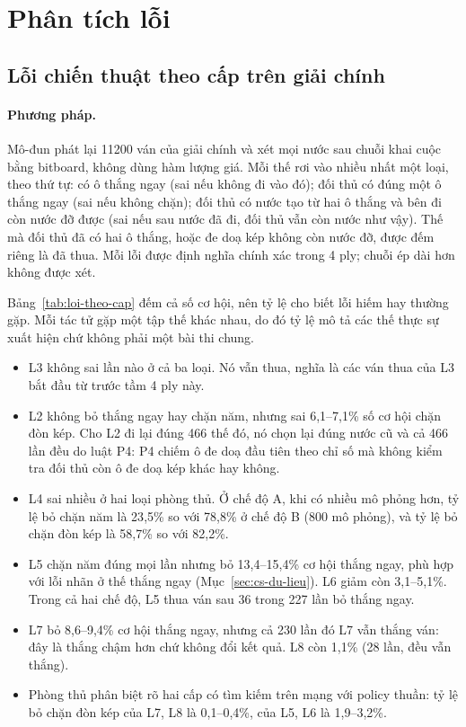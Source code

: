 

\section{Phân tích lỗi}
\subsection{Lỗi chiến thuật theo cấp trên giải chính}
\label{sec:loi-theo-cap}
\paragraph{Phương pháp.}
Mô-đun  phát lại \num{11200} ván của giải chính và xét mọi nước sau chuỗi khai cuộc bằng bitboard, không dùng hàm lượng giá. Mỗi thế rơi vào nhiều nhất một loại, theo thứ tự: có ô thắng ngay (sai nếu không đi vào đó); đối thủ có đúng một ô thắng ngay (sai nếu không chặn); đối thủ có nước tạo từ hai ô thắng và bên đi còn nước đỡ được (sai nếu sau nước đã đi, đối thủ vẫn còn nước như vậy). Thế mà đối thủ đã có hai ô thắng, hoặc đe doạ kép không còn nước đỡ, được đếm riêng là đã thua. Mỗi lỗi được định nghĩa chính xác trong 4 ply; chuỗi ép dài hơn không được xét.

Bảng~\ref{tab:loi-theo-cap} đếm cả số cơ hội, nên tỷ lệ cho biết lỗi hiếm hay thường gặp. Mỗi tác tử gặp một tập thế khác nhau, do đó tỷ lệ mô tả các thế thực sự xuất hiện chứ không phải một bài thi chung.
\begin{itemize}
\item L3 không sai lần nào ở cả ba loại. Nó vẫn thua, nghĩa là các ván thua của L3 bắt đầu từ trước tầm 4 ply này.
\item L2 không bỏ thắng ngay hay chặn năm, nhưng sai 6{,}1--7{,}1\% số cơ hội chặn đòn kép. Cho L2 đi lại đúng 466 thế đó, nó chọn lại đúng nước cũ và cả 466 lần đều do luật P4: P4 chiếm ô đe doạ đầu tiên theo chỉ số mà không kiểm tra đối thủ còn ô đe doạ kép khác hay không.
\item L4 sai nhiều ở hai loại phòng thủ. Ở chế độ A, khi có nhiều mô phỏng hơn, tỷ lệ bỏ chặn năm là 23{,}5\% so với 78{,}8\% ở chế độ B (800 mô phỏng), và tỷ lệ bỏ chặn đòn kép là 58{,}7\% so với 82{,}2\%.
\item L5 chặn năm đúng mọi lần nhưng bỏ 13{,}4--15{,}4\% cơ hội thắng ngay, phù hợp với lỗi nhãn ở thế thắng ngay (Mục~\ref{sec:cs-du-lieu}). L6 giảm còn 3{,}1--5{,}1\%. Trong cả hai chế độ, L5 thua ván sau 36 trong 227 lần bỏ thắng ngay.
\item L7 bỏ 8{,}6--9{,}4\% cơ hội thắng ngay, nhưng cả 230 lần đó L7 vẫn thắng ván: đây là thắng chậm hơn chứ không đổi kết quả. L8 còn 1{,}1\% (28 lần, đều vẫn thắng).
\item Phòng thủ phân biệt rõ hai cấp có tìm kiếm trên mạng với policy thuần: tỷ lệ bỏ chặn đòn kép của L7, L8 là 0{,}1--0{,}4\%, của L5, L6 là 1{,}9--3{,}2\%.
\end{itemize}
